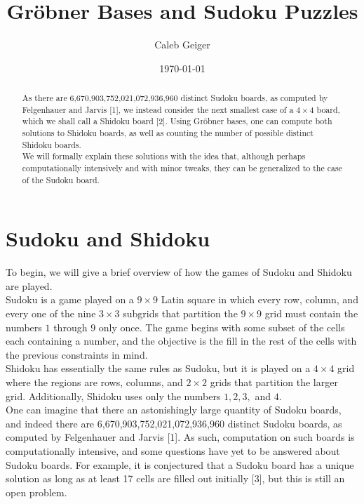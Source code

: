 \documentclass[12pt]{amsart}
\begin{document}
\title{Gr\" obner Bases and Sudoku Puzzles}

\author{Caleb Geiger}

\date{\today}

\begin{abstract}
As there are 6,670,903,752,021,072,936,960 distinct Sudoku boards, as computed by Felgenhauer and Jarvis [1], we instead consider the next smallest case of a $4\times 4$ board, which we shall call a Shidoku board [2]. Using Gr\" obner bases, one can compute both solutions to Shidoku boards, as well as counting the number of possible distinct Shidoku boards.\\
We will formally explain these solutions with the idea that, although perhaps computationally intensively and with minor tweaks, they can be generalized to the case of the Sudoku board.
\end{abstract}

\maketitle

\section{Sudoku and Shidoku}
To begin, we will give a brief overview of how the games of Sudoku and Shidoku are played.\\

Sudoku is a game played on a $9\times 9$ Latin square in which every row, column, and every one of the nine $3\times 3$ subgrids that partition the $9\times 9$ grid must contain the numbers $1$ through $9$ only once. The game begins with some subset of the cells each containing a number, and the objective is the fill in the rest of the cells with the previous constraints in mind.\\

Shidoku has essentially the same rules as Sudoku, but it is played on a $4\times 4$ grid where the regions are rows, columns, and $2\times 2$ grids that partition the larger grid. Additionally, Shidoku uses only the numbers $1, 2, 3,$ and $4$.\\

One can imagine that there an astonishingly large quantity of Sudoku boards, and indeed there are 6,670,903,752,021,072,936,960 distinct Sudoku boards, as computed by Felgenhauer and Jarvis [1]. As such, computation on such boards is computationally intensive, and some questions have yet to be answered about Sudoku boards. For example, it is conjectured that a Sudoku board has a unique solution as long as at least 17 cells are filled out initially [3], but this is still an open problem.\\
\end{document}
